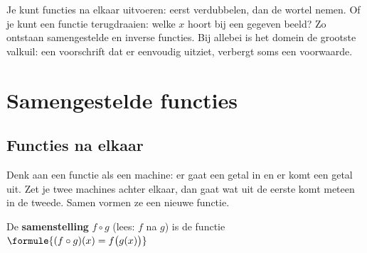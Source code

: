%



Je kunt functies na elkaar uitvoeren: eerst verdubbelen, dan de wortel nemen. Of je kunt een functie terugdraaien: welke $x$ hoort bij een gegeven beeld? Zo ontstaan samengestelde en inverse functies. Bij allebei is het domein de grootste valkuil: een voorschrift dat er eenvoudig uitziet, verbergt soms een voorwaarde.

\begin{oefeningen}[Start]

\end{oefeningen}

\section{Samengestelde functies}

\subsection{Functies na elkaar}

Denk aan een functie als een machine: er gaat een getal in en er komt een getal uit. Zet je twee machines achter elkaar, dan gaat wat uit de eerste komt meteen in de tweede. Samen vormen ze een nieuwe functie.

\begin{theorie}
De \textbf{\textcolor{accent}{samenstelling}} $f \circ g$ (lees: $f$ na $g$) is de functie \quad $\formule{(f \circ g)(x) = f\bigl(g(x)\bigr)}$
\end{theorie}

